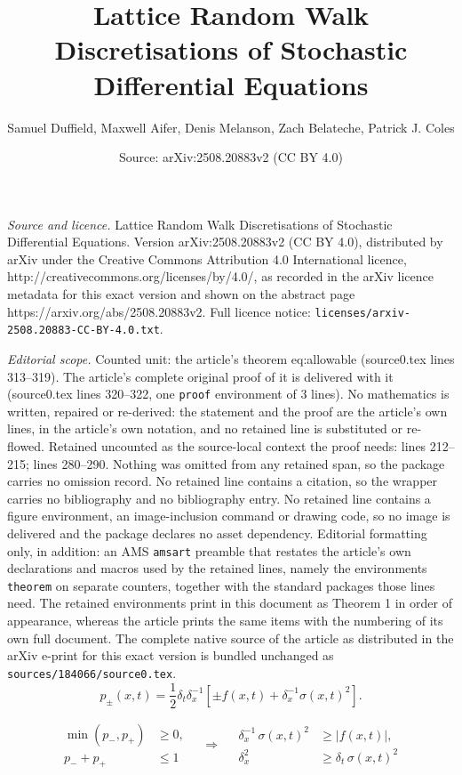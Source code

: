 \documentclass[10pt,a4paper]{amsart}
\title{Lattice Random Walk Discretisations of Stochastic Differential Equations}
\author{Samuel Duffield, Maxwell Aifer, Denis Melanson, Zach Belateche, Patrick J. Coles}
\date{Source: arXiv:2508.20883v2 (CC BY 4.0)}
\begin{document}
\maketitle

\noindent\emph{Source and licence.} Lattice Random Walk Discretisations of Stochastic Differential Equations. Version arXiv:2508.20883v2 (CC BY 4.0), distributed by arXiv under the Creative Commons Attribution 4.0 International licence, http://creativecommons.org/licenses/by/4.0/, as recorded in the arXiv licence metadata for this exact version and shown on the abstract page https://arxiv.org/abs/2508.20883v2. Full licence notice: \texttt{licenses/arxiv-2508.20883-CC-BY-4.0.txt}.\par\smallskip

\noindent\textit{Editorial scope.} Counted unit: the article's theorem eq:allowable (source0.tex lines 313--319). The article's complete original proof of it is delivered with it (source0.tex lines 320--322, one \texttt{proof} environment of 3 lines). No mathematics is written, repaired or re-derived: the statement and the proof are the article's own lines, in the article's own notation, and no retained line is substituted or re-flowed.  Retained uncounted as the source-local context the proof needs: lines 212--215; lines 280--290.  Nothing was omitted from any retained span, so the package carries no omission record.  No retained line contains a citation, so the wrapper carries no bibliography and no bibliography entry.  No retained line contains a figure environment, an image-inclusion command or drawing code, so no image is delivered and the package declares no asset dependency.  Editorial formatting only, in addition: an AMS \texttt{amsart} preamble that restates the article's own declarations and macros used by the retained lines, namely the environments \texttt{theorem} on separate counters, together with the standard packages those lines need.  The retained environments print in this document as Theorem 1 in order of appearance, whereas the article prints the same items with the numbering of its own full document.  The complete native source of the article as distributed in the arXiv e-print for this exact version is bundled unchanged as \texttt{sources/184066/source0.tex}.
\begin{equation}\label{eq:ternary-p}
    p_\pm(x, t) = \frac{1}{2} \delta_t\delta_x^{-1} \left[\pm f(x, t) +\delta_x^{-1}\sigma(x, t)^2\right].
\end{equation}

\begin{equation}\label{eq:combined_constraints}
    \begin{aligned}
      \min(p_-,p_+) &\ge 0,\\
      p_- + p_+     &\le 1
    \end{aligned}
    \quad\Longrightarrow\quad
    \begin{aligned}
      \delta_x^{-1}\,\sigma(x,t)^2 &\ge |f(x,t)|,\\
      \delta_x^2                   &\ge \delta_t\,\sigma(x,t)^2
    \end{aligned}
  \end{equation}
\end{document}

